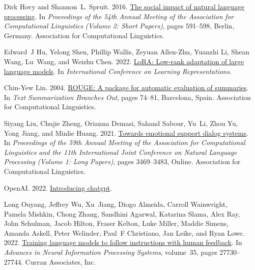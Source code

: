 \documentclass[11pt]{article}
\begin{document}
\begin{thebibliography}{20}
Dirk Hovy and Shannon~L. Spruit. 2016.
\newblock \href {https://doi.org/10.18653/v1/P16-2096} {The social impact of natural language processing}.
\newblock In \emph{Proceedings of the 54th Annual Meeting of the Association for Computational Linguistics (Volume 2: Short Papers)}, pages 591--598, Berlin, Germany. Association for Computational Linguistics.

Edward~J Hu, Yelong Shen, Phillip Wallis, Zeyuan Allen-Zhu, Yuanzhi Li, Shean Wang, Lu~Wang, and Weizhu Chen. 2022.
\newblock \href {https://openreview.net/forum?id=nZeVKeeFYf9} {Lo{RA}: Low-rank adaptation of large language models}.
\newblock In \emph{International Conference on Learning Representations}.

Chin-Yew Lin. 2004.
\newblock \href {https://aclanthology.org/W04-1013} {{ROUGE}: A package for automatic evaluation of summaries}.
\newblock In \emph{Text Summarization Branches Out}, pages 74--81, Barcelona, Spain. Association for Computational Linguistics.

Siyang Liu, Chujie Zheng, Orianna Demasi, Sahand Sabour, Yu~Li, Zhou Yu, Yong Jiang, and Minlie Huang. 2021.
\newblock \href {https://doi.org/10.18653/v1/2021.acl-long.269} {Towards emotional support dialog systems}.
\newblock In \emph{Proceedings of the 59th Annual Meeting of the Association for Computational Linguistics and the 11th International Joint Conference on Natural Language Processing (Volume 1: Long Papers)}, pages 3469--3483, Online. Association for Computational Linguistics.

OpenAI. 2022.
\newblock \href {https://openai.com/blog/chatgpt} {Introducing chatgpt}.

Long Ouyang, Jeffrey Wu, Xu~Jiang, Diogo Almeida, Carroll Wainwright, Pamela Mishkin, Chong Zhang, Sandhini Agarwal, Katarina Slama, Alex Ray, John Schulman, Jacob Hilton, Fraser Kelton, Luke Miller, Maddie Simens, Amanda Askell, Peter Welinder, Paul~F Christiano, Jan Leike, and Ryan Lowe. 2022.
\newblock \href {https://proceedings.neurips.cc/paper_files/paper/2022/file/b1efde53be364a73914f58805a001731-Paper-Conference.pdf} {Training language models to follow instructions with human feedback}.
\newblock In \emph{Advances in Neural Information Processing Systems}, volume~35, pages 27730--27744. Curran Associates, Inc.


\end{thebibliography}
\end{document}
